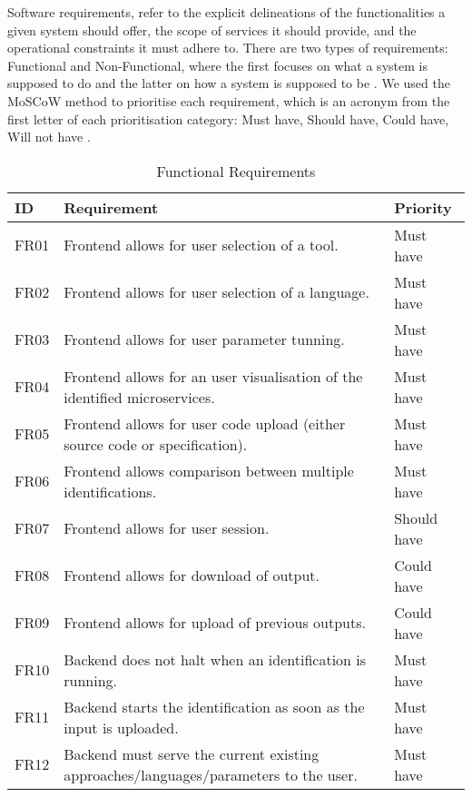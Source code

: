 Software requirements, refer to the explicit delineations of the
functionalities a given system should offer, the scope of services it should
provide, and the operational constraints it must adhere to. There are two types
of requirements: Functional and Non-Functional, where the first focuses on what
a system is supposed to do and the latter on how a system is supposed to be
\cite{wiegers2013software}. We used the MoSCoW method to prioritise each
requirement, which is an acronym from the first letter of each prioritisation
category: Must have, Should have, Could have, Will not have
\cite{brennan2009guide}.

\begin{table}[!htb] \caption{Functional Requirements} \label{tab:functional-requirements}
  \begin{center}
    \begin{tabular}[c]{p{4em}|p{20em}|p{6em}}
      \textbf{ID} &
      \textbf{Requirement} &
      \textbf{Priority} \\
      \hline FR01 & Frontend allows for user selection of a tool. & {Must have} \\
      \hline FR02 & Frontend allows for user selection of a language. & {Must have} \\
      \hline FR03 & Frontend allows for user parameter tunning. & {Must have} \\
      \hline FR04 & Frontend allows for an user visualisation of the identified microservices. & {Must have} \\
      \hline FR05 & Frontend allows for user code upload (either source code or specification). & {Must have} \\
      \hline FR06 & Frontend allows comparison between multiple identifications. & {Must have} \\
      \hline FR07 & Frontend allows for user session. & {Should have} \\
      \hline FR08 & Frontend allows for download of output. & {Could have} \\
      \hline FR09 & Frontend allows for upload of previous outputs. & {Could have} \\
      \hline FR10 & Backend does not halt when an identification is running. & {Must have} \\
      \hline FR11 & Backend starts the identification as soon as the input is uploaded. & {Must have} \\
      \hline FR12 & Backend must serve the current existing approaches/languages/parameters to the user. & {Must have} \\

\end{tabular}
\end{center}
\end{table}

